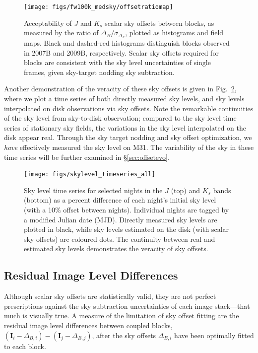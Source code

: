 \documentclass[iop]{emulateapj}
\newcommand{\vect}[1]{\boldsymbol{#1}} %
\newcommand{\Fig}[1]{Fig.~\ref{fig:#1}}  %
\newcommand{\Sec}[1]{\S\ref{sec:#1}}  %
\begin{document}
\begin{figure}[t]
\centering
\texttt{[image: figs/fw100k\_medsky/offsetratiomap]}
\caption{Acceptability of $J$ and $K_s$ scalar sky offsets between blocks, as measured by the ratio of $\Delta_B/\sigma_{\Delta_F}$, plotted as histograms and field maps. Black and dashed-red histograms distinguish blocks observed in 2007B and 2009B, respectively. Scalar sky offsets required for blocks are consistent with the sky level uncertainties of single frames, given sky-target nodding sky subtraction.}
\label{fig:offset_ratio_map}
\end{figure}

Another demonstration of the veracity of these sky offsets is given in \Fig{skylevel_timeseries}, where we plot a time series of both directly measured sky levels, and sky levels interpolated on disk observations via sky offsets.
Note the remarkable continuities of the sky level from sky-to-disk observation; compared to the sky level time series of stationary sky fields, the variations in the sky level interpolated on the disk appear real.
Through the sky target nodding and sky offset optimization, we \emph{have} effectively measured the sky level on M31.
The variability of the sky in these time series will be further examined in \Sec{offsetevo}.

\begin{figure}[t]
\centering
\texttt{[image: figs/skylevel\_timeseries\_all]}
\caption{Sky level time series for selected nights in the $J$ (top) and $K_s$ bands (bottom) as a percent difference of each night's initial sky level (with a 10\% offset between nights).
Individual nights are tagged by a modified Julian date (MJD).
Directly measured sky levels are plotted in black, while sky levels estimated on the disk (with scalar sky offsets) are coloured dots. The continuity between real and estimated sky levels demonstrates the veracity of sky offsets.}
\label{fig:skylevel_timeseries}
\end{figure}

\subsection{Residual Image Level Differences}
\label{sec:residual_diffs}

Although scalar sky offsets are statistically valid, they are not perfect prescriptions against the sky subtraction uncertainties of each image stack---that much is visually true.
A measure of the limitation of sky offset fitting are the residual image level differences between coupled blocks, $(\vect{I}_i - \Delta_{B,i}) - (\vect{I}_j - \Delta_{B,j})$, after the sky offsets $\Delta_{B,i}$ have been optimally fitted to each block.
\end{document}
